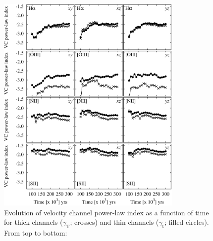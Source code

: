 \documentclass[useAMS,usenatbib]{mn2e}
\newcommand\gammaVCAthin{\ensuremath{\gamma_{\mathrm{t}}}} %
\newcommand\gammaVCAvthick{\ensuremath{\gamma_{\mathrm{T}}}} %
\providecommand{\DIFadd}[1]{{\protect\color{red!70!black}#1}} %
\providecommand{\DIFaddbegin}{\color{red!70!black}} %
\providecommand{\DIFdelbegin}{} %
\providecommand{\DIFdelend}{} %
\providecommand{\DIFaddFL}[1]{\DIFadd{#1}} %
\providecommand{\DIFdelFL}[1]{} %
\providecommand{\DIFaddbeginFL}{} %
\providecommand{\DIFaddendFL}{} %
\providecommand{\DIFdelbeginFL}{} %
\providecommand{\DIFdelendFL}{} %
\begin{document}
\DIFdelbegin %
\DIFdelend \DIFaddbegin \begin{figure}
\DIFaddendFL \centering
\DIFaddbeginFL \includegraphics[width=0.8\textwidth]{vca-time-trends-all}
\DIFaddendFL \caption{\DIFdelbeginFL \DIFdelFL{Power-law indices for the }\DIFdelendFL \DIFaddbeginFL \DIFaddFL{ Evolution of }\DIFaddendFL velocity channel \DIFdelbeginFL \DIFdelFL{analysis}\DIFdelendFL \DIFaddbeginFL \DIFaddFL{power-law index as a function
  of time for thick channels (}\gammaVCAvthick\DIFaddFL{; crosses) and thin
  channels (}\gammaVCAthin\DIFaddFL{; filled circles)}\DIFaddendFL .  \DIFdelbeginFL %
\DIFdelFL{Line }%
\DIFdelFL{Time }%
\DIFdelFL{Plane }%
\DIFdelFL{$\gamma_{\mathrm{vthick}}$ }%
\DIFdelFL{$\gamma_{\mathrm{thin}}$}%
\DIFdelFL{$\gamma_{\mathrm thin}$}%
\DIFdelFL{(yrs) }%
\DIFdelFL{No Broadening }%
\DIFdelFL{Broadening }%
\DIFdelendFL \DIFaddbeginFL \DIFaddFL{From top to bottom:
}}
\end{figure}
\end{document}
